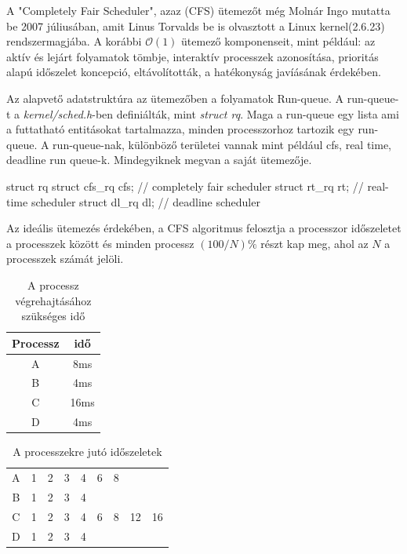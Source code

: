A "Completely Fair Scheduler", azaz (CFS) ütemezőt még Molnár Ingo mutatta be 2007 júliusában, amit Linus Torvalds be is olvasztott a Linux kernel(2.6.23) rendszermagjába. A korábbi $\mathcal{O}(1)$ ütemező komponenseit, mint például: az aktív és lejárt folyamatok tömbje, interaktív processzek azonosítása, prioritás alapú időszelet koncepció, eltávolították, a hatékonyság javíásának érdekében. 

Az alapvető adatstruktúra az ütemezőben a folyamatok Run-queue. A run-queue-t a \textit{kernel/sched.h}-ben definiálták, mint \textit{struct rq}. Maga a run-queue egy lista ami a futtatható entitásokat tartalmazza, minden processzorhoz tartozik egy run-queue. A run-queue-nak, különböző területei vannak mint például cfs, real time, deadline run queue-k.
Mindegyiknek megvan a saját ütemezője.
\begin{cpp}
struct rq {
      struct cfs_rq cfs;  // completely fair scheduler
      struct rt_rq rt;    // real-time scheduler
      struct dl_rq dl;    // deadline scheduler
}
\end{cpp}

Az ideális ütemezés érdekében, a CFS algoritmus felosztja a processzor időszeletet a processzek között és minden processz $(100/N)\%$ részt kap meg, ahol az $N$ a processzek számát jelöli.
\begin{table}[h]
\centering
\caption{A processz végrehajtásához szükséges idő}
\label{tab:processtimes}
\begin{tabular}{|c|c|}
\hline
Processz & idő \\
\hline
A & 8ms \\
B & 4ms \\
C & 16ms \\
D & 4ms \\
\hline
\end{tabular}
\end{table}

\begin{table}[h]
\centering
\caption{A processzekre jutó időszeletek}
\label{tab:timeslices}
\begin{tabular}{|c|c|c|c|c|c|c|c|c|}
\hline
A & 1 & 2 & 3 & 4 & 6 & 8 & & \\
B & 1 & 2 & 3 & 4 & & & & \\
C & 1 & 2 & 3 & 4 & 6 & 8 & 12 & 16 \\
D & 1 & 2 & 3 & 4 & & & & \\
\hline
\end{tabular}
\end{table}

